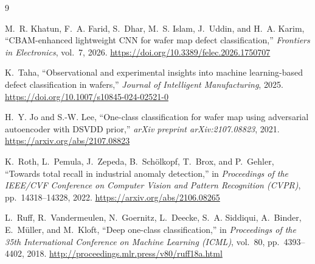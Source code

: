 \documentclass[11pt]{article}
\begin{document}
\newpage
\begin{thebibliography}{9}

M.~R. Khatun, F.~A. Farid, S.~Dhar, M.~S. Islam, J.~Uddin, and H.~A. Karim,
\newblock ``CBAM-enhanced lightweight CNN for wafer map defect classification,''
\newblock \textit{Frontiers in Electronics}, vol.~7, 2026.
\newblock \url{https://doi.org/10.3389/felec.2026.1750707}

K.~Taha,
\newblock ``Observational and experimental insights into machine learning-based defect classification in wafers,''
\newblock \textit{Journal of Intelligent Manufacturing}, 2025.
\newblock \url{https://doi.org/10.1007/s10845-024-02521-0}

H.~Y. Jo and S.-W. Lee,
\newblock ``One-class classification for wafer map using adversarial autoencoder with DSVDD prior,''
\newblock \textit{arXiv preprint arXiv:2107.08823}, 2021.
\newblock \url{https://arxiv.org/abs/2107.08823}

K.~Roth, L.~Pemula, J.~Zepeda, B.~Sch\"{o}lkopf, T.~Brox, and P.~Gehler,
\newblock ``Towards total recall in industrial anomaly detection,''
\newblock in \textit{Proceedings of the IEEE/CVF Conference on Computer Vision and Pattern Recognition (CVPR)},
\newblock pp.\ 14318--14328, 2022.
\newblock \url{https://arxiv.org/abs/2106.08265}

L.~Ruff, R.~Vandermeulen, N.~Goernitz, L.~Deecke, S.~A. Siddiqui, A.~Binder, E.~M\"{u}ller, and M.~Kloft,
\newblock ``Deep one-class classification,''
\newblock in \textit{Proceedings of the 35th International Conference on Machine Learning (ICML)},
\newblock vol.\ 80, pp.\ 4393--4402, 2018.
\newblock \url{http://proceedings.mlr.press/v80/ruff18a.html}

\end{thebibliography}
\end{document}

